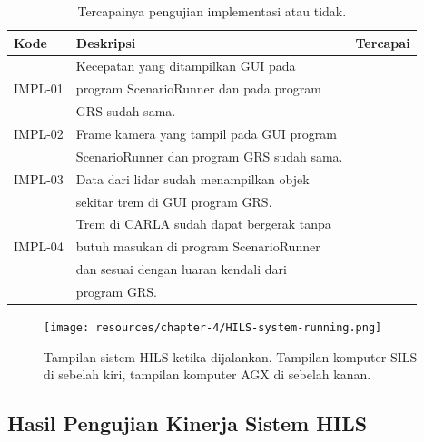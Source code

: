 \begin{table}[!htbp]
	\begin{center}
		\begin{tabular}{|l|l|l|}
			\hline
			\textbf{Kode} & \textbf{Deskripsi}                         & \textbf{Tercapai} \\
			\hline
			              & Kecepatan yang ditampilkan GUI pada        &                   \\
			IMPL-01       & program ScenarioRunner dan pada program    & \checkmark        \\
			              & GRS sudah sama.                            &                   \\
			\hline
			IMPL-02       & Frame kamera yang tampil pada GUI program  & \checkmark        \\
			              & ScenarioRunner dan program GRS sudah sama. &                   \\
			\hline
			IMPL-03       & Data dari lidar sudah menampilkan objek    & \checkmark        \\
			              & sekitar trem di GUI program GRS.           &                   \\
			\hline
			              & Trem di CARLA sudah dapat bergerak tanpa   &                   \\
			IMPL-04       & butuh masukan di program ScenarioRunner    & \checkmark        \\
			              & dan sesuai dengan luaran kendali dari      &                   \\
			              & program GRS.                               &                   \\
			\hline
		\end{tabular}
	\end{center}

	\caption{Tercapainya pengujian implementasi atau tidak.}
	\label{chapter-4-tbl-impl-criteria-result}
\end{table}

\begin{figure}[!htbp]
	\centering
	\texttt{[image: resources/chapter-4/HILS-system-running.png]}
	\caption{Tampilan sistem HILS ketika dijalankan. Tampilan komputer SILS di
		sebelah kiri, tampilan komputer AGX di sebelah kanan.}
	\label{chapter-4-fig-hils-running}
\end{figure}

\subsection{Hasil Pengujian Kinerja Sistem HILS}

